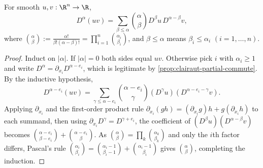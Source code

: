 \begin{proposition}
\label{prop:leibniz-formula}
\leanok
For smooth $u,v : \R^n \to \R$,
$$D^\alpha(uv) = \sum_{\beta \leq \alpha} \binom{\alpha}{\beta} D^\beta u \, D^{\alpha-\beta} v,$$
where $\binom{\alpha}{\beta} := \frac{\alpha!}{\beta!(\alpha-\beta)!} = \prod_{i=1}^n \binom{\alpha_i}{\beta_i}$, and $\beta \leq \alpha$ means $\beta_i \leq \alpha_i$ $(i = 1, \ldots, n)$.
\end{proposition}
\begin{proof}
\leanok
Induct on $|\alpha|$. If $|\alpha| = 0$ both sides equal $uv$. Otherwise pick $i$
with $\alpha_i \geq 1$ and write $D^\alpha = \partial_{x_i} D^{\alpha - e_i}$,
which is legitimate by \cref{prop:clairaut-partial-commute}. By the inductive
hypothesis,
$$D^{\alpha - e_i}(uv) = \sum_{\gamma \leq \alpha - e_i}
   \binom{\alpha - e_i}{\gamma} (D^\gamma u)(D^{\alpha - e_i - \gamma} v).$$
Applying $\partial_{x_i}$ and the first-order product rule
$\partial_{x_i}(gh) = (\partial_{x_i}g)h + g(\partial_{x_i}h)$ to each summand,
then using $\partial_{x_i} D^\gamma = D^{\gamma + e_i}$, the coefficient of
$(D^\beta u)(D^{\alpha - \beta} v)$ becomes
$\binom{\alpha - e_i}{\beta - e_i} + \binom{\alpha - e_i}{\beta}$. As
$\binom{\alpha}{\beta} = \prod_k \binom{\alpha_k}{\beta_k}$ and only the $i$th
factor differs, Pascal's rule
$\binom{\alpha_i}{\beta_i} = \binom{\alpha_i - 1}{\beta_i - 1} + \binom{\alpha_i - 1}{\beta_i}$
gives $\binom{\alpha}{\beta}$, completing the induction.
\end{proof}

